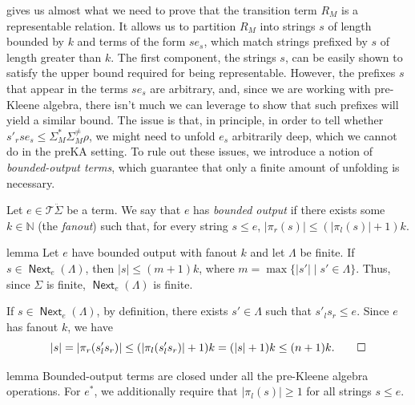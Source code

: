 \documentclass[a4paper,UKenglish,cleveref, autoref, thm-restate]{lipics-v2021}
\DeclareMathOperator{\Next}{\mathsf{Next}}
\begin{document}
 gives us almost what we need to prove that the transition
term $R_M$ is a representable relation. It allows us to partition \(R_M\) into
strings $s$ of length bounded by $k$ and terms of the form $se_s$, which match
strings prefixed by $s$ of length greater than $k$.  The first component, the
strings $s$, can be easily shown to satisfy the upper bound required for being
representable. However, the prefixes $s$ that appear in the terms $se_s$ are
arbitrary, and, since we are working with pre-Kleene algebra, there isn't much
we can leverage to show that such prefixes will yield a similar bound.  The
issue is that, in principle, in order to tell whether
$s'_rse_s  \leq   \Sigma _M^* \Sigma _M^{ \neq } \rho $, we might need to unfold $e_s$ arbitrarily deep,
which we cannot do in the preKA setting.  To rule out these issues, we introduce
a notion of \emph{bounded-output terms}, which guarantee that only a finite
amount of unfolding is necessary.

\begin{definition}
  \label{def:bounded-output}
  Let $e  \in  \mathcal{T}\ddot{ \Sigma }$ be a term.  We say that $e$ has \emph{bounded
    output} if there exists some $k  \in  \mathbb{N}$ (the \emph{fanout}) such that, for
  every string $s  \leq  e$, $| \pi _r(s)|  \leq  (| \pi _l(s)|+1)k$.
\end{definition}

\begin{theoremEnd}{lemma}
  \label{lem:step-finite}
  Let $e$ have bounded output with fanout $k$ and let $ \Lambda $ be finite.  If
  $s  \in  \Next_e( \Lambda )$, then $|s|  \leq  (m+1)k$, where $m = \max\{ |s'|  \mid  s'  \in   \Lambda \}$.
  Thus, since $ \Sigma $ is finite, $\Next_e( \Lambda )$ is finite.
\end{theoremEnd}

\begin{proofEnd}
  If $s  \in  \Next_e( \Lambda )$, by definition, there exists $s'  \in   \Lambda $ such that
  $s'_ls_r  \leq  e$.  Since $e$ has fanout $k$, we have
  \[ |s| = | \pi _r(s'_ls_r)|  \leq  (| \pi _l(s'_ls_r)|+1)k = (|s|+1)k  \leq  (n+1)k. \qedhere\]
\end{proofEnd}

\begin{theoremEnd}{lemma}
  \label{lem:bounded-output-closure}
  Bounded-output terms are closed under all the pre-Kleene algebra
  operations. For $e^*$, we additionally require that $| \pi _l(s)|  \geq  1$ for all
  strings $s  \leq  e$.
\end{theoremEnd}
\end{document}
